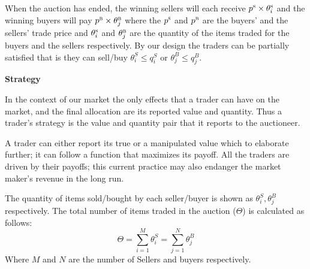 When the auction has ended, the winning sellers will each receive $p^{\textsc{s}} \times \theta_{i}^\textsc{s}$ and the winning buyers will pay $p^{\textsc{b}} \times \theta_{j}^\textsc{b}$ where the $p^{\textsc{s}}$ and $p^{\textsc{b}}$ are the buyers' and the sellers' trade price and $\theta_{i}^\textsc{s}$ and $\theta_{j}^\textsc{b}$ are the quantity of the items traded for the buyers and the sellers respectively. By our design the traders can be partially satisfied that is they can sell/buy $\theta_i^S \leq q_i^S$ or $\theta_j^B \leq q_j^B$.

\begin{Definition}
\label{def_strategy}
\textbf{Strategy} 

In the context of our market the only effects that a trader can have on the market, and the final allocation are its reported value and quantity. Thus a trader's strategy is the value and quantity pair that it reports to the auctioneer.
\end{Definition}
A trader can either report its true or a manipulated value which to elaborate further; it can follow a function that maximizes its payoff. All the traders are driven by their payoffs; this current practice may also endanger the market maker's revenue in the long run.

The quantity of items sold/bought by each seller/buyer is shown as $\theta_i^S, \theta_j^B$ respectively. The total number of items traded in the auction ($\Theta$) is calculated as follows:
\begin{equation}
\label{Thetha}
\Theta = \sum_{i=1}^{M} \theta_i^S = \sum_{j=1}^{N} \theta_j^B
\end{equation}
Where $M$ and $N$ are the number of Sellers and buyers respectively.

